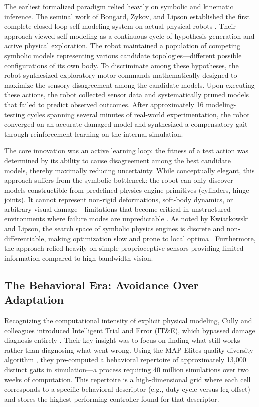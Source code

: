 \documentclass[12pt,a4paper,oneside]{report}
\begin{document}
The earliest formalized paradigm relied heavily on symbolic and kinematic inference. The seminal work of Bongard, Zykov, and Lipson established the first complete closed-loop self-modeling system on actual physical robots \cite{bongard2006resilient}. Their approach viewed self-modeling as a continuous cycle of hypothesis generation and active physical exploration. The robot maintained a population of competing symbolic models representing various candidate topologies---different possible configurations of its own body. To discriminate among these hypotheses, the robot synthesized exploratory motor commands mathematically designed to maximize the sensory disagreement among the candidate models. Upon executing these actions, the robot collected sensor data and systematically pruned models that failed to predict observed outcomes. After approximately 16 modeling-testing cycles spanning several minutes of real-world experimentation, the robot converged on an accurate damaged model and synthesized a compensatory gait through reinforcement learning on the internal simulation.

The core innovation was an active learning loop: the fitness of a test action was determined by its ability to cause disagreement among the best candidate models, thereby maximally reducing uncertainty. While conceptually elegant, this approach suffers from the symbolic bottleneck: the robot can only discover models constructible from predefined physics engine primitives (cylinders, hinge joints). It cannot represent non-rigid deformations, soft-body dynamics, or arbitrary visual damage---limitations that become critical in unstructured environments where failure modes are unpredictable \cite{kwiatkowski2019task}. As noted by Kwiatkowski and Lipson, the search space of symbolic physics engines is discrete and non-differentiable, making optimization slow and prone to local optima \cite{kwiatkowski2019task}. Furthermore, the approach relied heavily on simple proprioceptive sensors providing limited information compared to high-bandwidth vision.

\subsection{The Behavioral Era: Avoidance Over Adaptation}

Recognizing the computational intensity of explicit physical modeling, Cully and colleagues introduced Intelligent Trial and Error (IT\&E), which bypassed damage diagnosis entirely \cite{cully2015robots}. Their key insight was to focus on finding what still works rather than diagnosing what went wrong. Using the MAP-Elites quality-diversity algorithm \cite{mouret2015illuminating}, they pre-computed a behavioral repertoire of approximately 13,000 distinct gaits in simulation---a process requiring 40 million simulations over two weeks of computation. This repertoire is a high-dimensional grid where each cell corresponds to a specific behavioral descriptor (e.g., duty cycle versus leg offset) and stores the highest-performing controller found for that descriptor.
\end{document}
